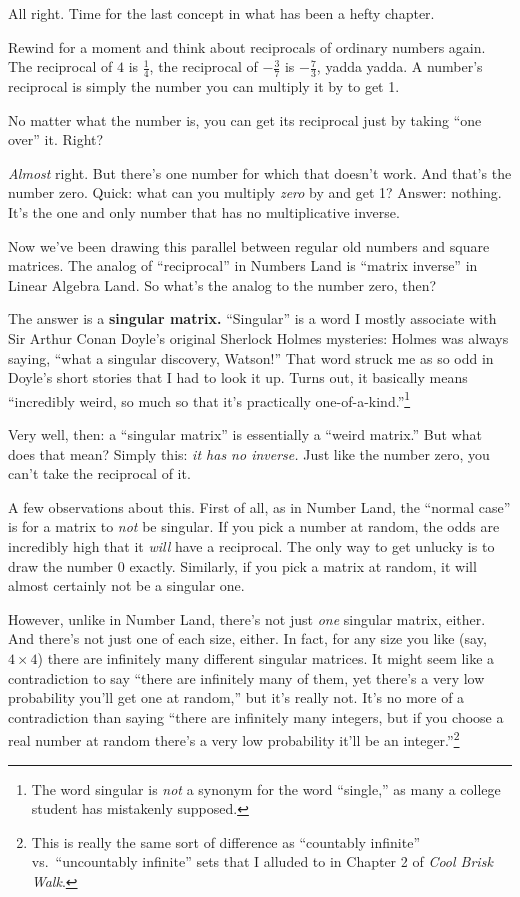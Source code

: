 All right. Time for the last concept in what has been a hefty chapter.

Rewind for a moment and think about reciprocals of ordinary numbers again. The
reciprocal of $4$ is $\frac{1}{4}$, the reciprocal of $-\frac{3}{7}$ is
$-\frac{7}{3}$, yadda yadda. A number's reciprocal is simply the number you can
multiply it by to get 1.

No matter what the number is, you can get its reciprocal just by taking ``one
over'' it. Right?


\textit{Almost} right. But there's one number for which that doesn't work. And
that's the number zero. Quick: what can you multiply \textit{zero} by and get
1? Answer: nothing. It's the one and only number that has no multiplicative
inverse.

Now we've been drawing this parallel between regular old numbers and square
matrices. The analog of ``reciprocal'' in Numbers Land is ``matrix inverse'' in
Linear Algebra Land. So what's the analog to the number zero, then?


The answer is a \textbf{singular matrix.} ``Singular'' is a word I mostly
associate with Sir Arthur Conan Doyle's original Sherlock Holmes mysteries:
Holmes was always saying, ``what a singular discovery, Watson!'' That word
struck me as so odd in Doyle's short stories that I had to look it up. Turns
out, it basically means ``incredibly weird, so much so that it's practically
one-of-a-kind.''\footnote{The word singular is \textit{not} a synonym for the
word ``single,'' as many a college student has mistakenly supposed.}

Very well, then: a ``singular matrix'' is essentially a ``weird matrix.'' But
what does that mean? Simply this: \textit{it has no inverse.} Just like the
number zero, you can't take the reciprocal of it.

A few observations about this. First of all, as in Number Land, the ``normal
case'' is for a matrix to \textit{not} be singular. If you pick a number at
random, the odds are incredibly high that it \textit{will} have a reciprocal.
The only way to get unlucky is to draw the number 0 exactly. Similarly, if you
pick a matrix at random, it will almost certainly not be a singular one.

However, unlike in Number Land, there's not just \textit{one} singular matrix,
either. And there's not just one of each size, either. In fact, for any size
you like (say, $4\times 4$) there are infinitely many different singular
matrices. It might seem like a contradiction to say ``there are infinitely many
of them, yet there's a very low probability you'll get one at random,'' but
it's really not. It's no more of a contradiction than saying ``there are
infinitely many integers, but if you choose a real number at random there's a
very low probability it'll be an integer.''\footnote{This is really the same
sort of difference as ``countably infinite'' vs.~``uncountably infinite'' sets
that I alluded to in Chapter 2 of \textit{Cool Brisk Walk}.}

